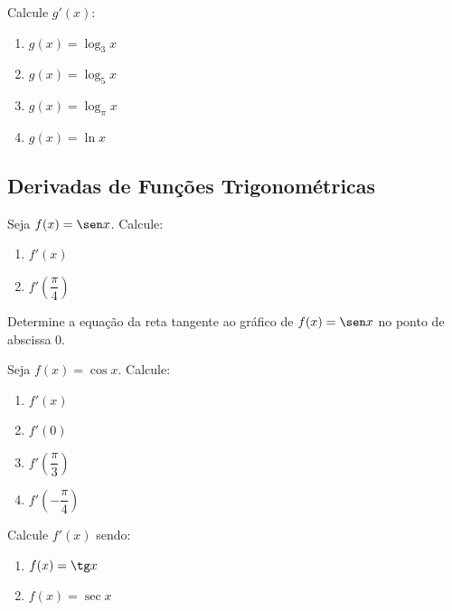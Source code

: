 \begin{exercicio}[6]
Calcule $g'(x)$:
\begin{enumerate}[label=\alph*)]
    \item $g(x) = \log_3 x$
    \item $g(x) = \log_5 x$
    \item $g(x) = \log_\pi x$
    \item $g(x) = \ln x$
\end{enumerate}
\end{exercicio}

\clearpage

\subsection{Derivadas de Funções Trigonométricas}

\begin{exercicio}[1]
Seja $f(x) = \sen x$. Calcule:
\begin{enumerate}[label=\alph*)]
    \item $f'(x)$
    \item $f'\!\left(\dfrac{\pi}{4}\right)$
\end{enumerate}
\end{exercicio}

\begin{exercicio}[2]
Determine a equação da reta tangente ao gráfico de $f(x) = \sen x$ no ponto de abscissa 0.
\end{exercicio}

\begin{exercicio}[3]
Seja $f(x) = \cos x$. Calcule:
\begin{enumerate}[label=\alph*)]
    \item $f'(x)$
    \item $f'(0)$
    \item $f'\!\left(\dfrac{\pi}{3}\right)$
    \item $f'\!\left(-\dfrac{\pi}{4}\right)$
\end{enumerate}
\end{exercicio}

\begin{exercicio}[4]
Calcule $f'(x)$ sendo:
\begin{enumerate}[label=\alph*)]
    \item $f(x) = \tg x$
    \item $f(x) = \sec x$
\end{enumerate}
\end{exercicio}

